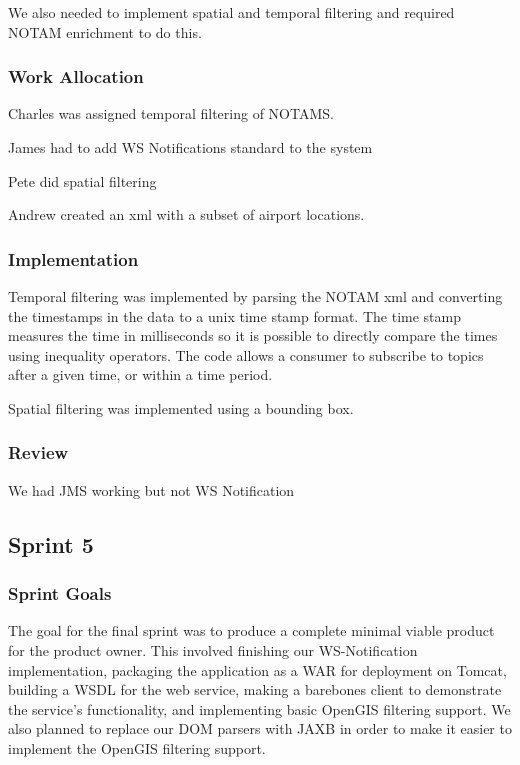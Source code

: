 \documentclass[a4paper, 12pt]{article}
\begin{document}
We also needed to implement spatial and temporal filtering and required NOTAM enrichment to do this. 


\subsubsection{Work Allocation}

Charles was assigned temporal filtering of NOTAMS.

James had to add WS Notifications standard to the system

Pete did spatial filtering

Andrew created an xml with a subset of airport locations.

\subsubsection{Implementation}

Temporal filtering was implemented by parsing the NOTAM xml and converting the timestamps in the data to a unix time stamp format. The time stamp measures the time in milliseconds so it is possible to directly compare the times using inequality operators. The code allows a consumer to subscribe to topics after a given time, or within a time period.

Spatial filtering was implemented using a bounding box.

\subsubsection{Review}

We had JMS working but not WS Notification

\subsection{Sprint 5}

\subsubsection{Sprint Goals}

The goal for the final sprint was to produce a complete minimal viable product for the product owner. This involved finishing our WS-Notification implementation, packaging the application as a WAR for deployment on Tomcat, building a WSDL for the web service, making a barebones client to demonstrate the service's functionality, and implementing basic OpenGIS filtering support. We also planned to replace our DOM parsers with JAXB in order to make it easier to implement the OpenGIS filtering support.
\end{document}
